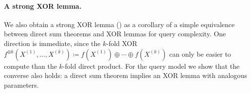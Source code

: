 \documentclass[11pt]{article}
\newcommand{\lnote}[1]{\footnote{{\bf \color{blue}Li-Yang}: {#1}}}
\newcommand{\gray}[1]{{\color{gray}{#1}}}
\begin{document}
\paragraph{A strong XOR lemma.} We also obtain a strong XOR lemma () as a corollary of a simple equivalence between direct sum theorems and XOR lemmas for query complexity. One direction is immediate, since the $k$-fold XOR $f^{\oplus k}(X^{(1)},\ldots,X^{(k)}) \coloneqq f(X^{(1)}) \oplus \cdots \oplus f(X^{(k)})$ can only be easier to compute than the $k$-fold direct product.
For the query model we show that the converse also holds: a direct sum theorem implies an XOR lemma with analogous
parameters. %




\end{document}
